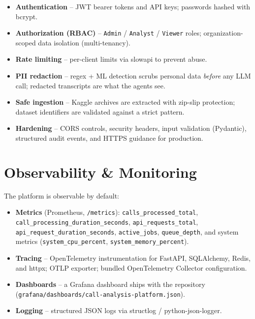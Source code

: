 \documentclass[11pt,a4paper]{article}
\begin{document}
\begin{itemize}
  \item \textbf{Authentication} -- JWT bearer tokens and API keys; passwords hashed with bcrypt.
  \item \textbf{Authorization (RBAC)} -- \texttt{Admin} / \texttt{Analyst} / \texttt{Viewer}
        roles; organization-scoped data isolation (multi-tenancy).
  \item \textbf{Rate limiting} -- per-client limits via slowapi to prevent abuse.
  \item \textbf{PII redaction} -- regex + ML detection scrubs personal data \emph{before}
        any LLM call; redacted transcripts are what the agents see.
  \item \textbf{Safe ingestion} -- Kaggle archives are extracted with zip-slip protection;
        dataset identifiers are validated against a strict pattern.
  \item \textbf{Hardening} -- CORS controls, security headers, input validation
        (Pydantic), structured audit events, and HTTPS guidance for production.
\end{itemize}

\section{Observability \& Monitoring}

The platform is observable by default:

\begin{itemize}
  \item \textbf{Metrics} (Prometheus, \texttt{/metrics}): \texttt{calls\_\allowbreak processed\_\allowbreak total},
        \texttt{call\_\allowbreak processing\_\allowbreak duration\_\allowbreak seconds},
        \texttt{api\_\allowbreak requests\_\allowbreak total},
        \texttt{api\_\allowbreak request\_\allowbreak duration\_\allowbreak seconds},
        \texttt{active\_jobs}, \texttt{queue\_depth}, and system metrics
        (\texttt{system\_\allowbreak cpu\_\allowbreak percent},
        \texttt{system\_\allowbreak memory\_\allowbreak percent}).
  \item \textbf{Tracing} -- OpenTelemetry instrumentation for FastAPI, SQLAlchemy, Redis,
        and httpx; OTLP exporter; bundled OpenTelemetry Collector configuration.
  \item \textbf{Dashboards} -- a Grafana dashboard ships with the repository
        (\texttt{grafana/dashboards/\allowbreak call-analysis-platform.\allowbreak json}).
  \item \textbf{Logging} -- structured JSON logs via structlog / python-json-logger.
\end{itemize}
\end{document}
